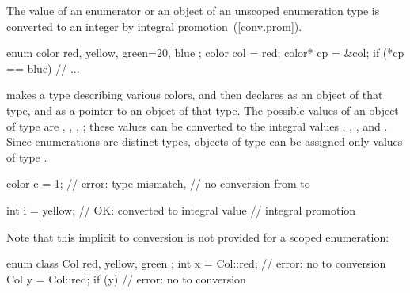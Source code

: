 \pnum
The value of an enumerator or an object of an unscoped enumeration type is
converted to an integer by integral promotion~(\ref{conv.prom}).
\begin{example}

%
\begin{codeblock}
  enum color { red, yellow, green=20, blue };
  color col = red;
  color* cp = &col;
  if (*cp == blue)              // ...
\end{codeblock}

makes  a type describing various colors, and then declares
 as an object of that type, and  as a pointer to an
object of that type. The possible values of an object of type
 are , , ,
; these values can be converted to the integral values
, , , and . Since enumerations are
distinct types, objects of type  can be assigned only
values of type .

\begin{codeblock}
color c = 1;                    // error: type mismatch,
                                // no conversion from  to 

int i = yellow;                 // OK:  converted to integral value 
                                // integral promotion
\end{codeblock}

Note that this implicit  to 
conversion is not provided for a scoped enumeration:

\begin{codeblock}
enum class Col { red, yellow, green };
int x = Col::red;               // error: no  to  conversion
Col y = Col::red;
if (y) { }                      // error: no  to  conversion
\end{codeblock}

\end{example}

